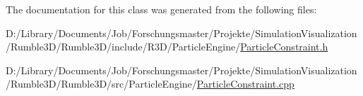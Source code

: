 The documentation for this class was generated from the following files\+:\begin{DoxyCompactItemize}
\item 
D\+:/\+Library/\+Documents/\+Job/\+Forschungsmaster/\+Projekte/\+Simulation\+Visualization/\+Rumble3\+D/\+Rumble3\+D/include/\+R3\+D/\+Particle\+Engine/\mbox{\hyperlink{_particle_constraint_8h}{Particle\+Constraint.\+h}}\item 
D\+:/\+Library/\+Documents/\+Job/\+Forschungsmaster/\+Projekte/\+Simulation\+Visualization/\+Rumble3\+D/\+Rumble3\+D/src/\+Particle\+Engine/\mbox{\hyperlink{_particle_constraint_8cpp}{Particle\+Constraint.\+cpp}}\end{DoxyCompactItemize}
